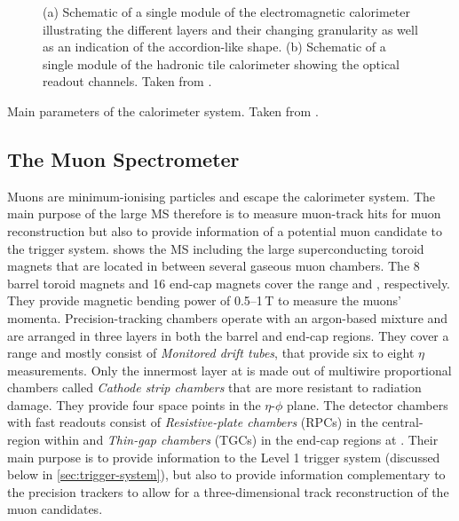\begin{figure}
    \caption{(a) Schematic of a single module of the electromagnetic calorimeter illustrating the different layers and their changing granularity as well as an indication of the accordion-like shape. (b) Schematic of a single module of the hadronic tile calorimeter showing the optical readout channels. Taken from .}
    \label{fig:ATLASmodules}
\end{figure}

\begin{table}
    \caption{Main parameters of the calorimeter system. Taken from .}
    \label{tab:ATLAScalorimeter-parameters}
\end{table}



\subsection{The Muon Spectrometer}
Muons are minimum-ionising particles and escape the calorimeter system.
The main purpose of the large MS therefore is to measure muon-track hits for muon reconstruction but also to provide information of a potential muon candidate to the trigger system.
 shows the MS including the large superconducting toroid magnets that are located in between several gaseous muon chambers.
The 8 barrel toroid magnets and 16 end-cap magnets cover the range  and , respectively. They provide magnetic bending power of \numrange{0.5}{1}\,T to measure the muons' momenta. Precision-tracking chambers operate with an argon-based mixture and are arranged in three layers in both the barrel and end-cap regions. They cover a range  and mostly consist of \emph{Monitored drift tubes}, that provide six to eight $\eta$ measurements. Only the innermost layer at  is made out of multiwire proportional chambers called \emph{Cathode strip chambers} that are more resistant to radiation damage. They provide four space points in the $\eta$-$\phi$ plane. The detector chambers with fast readouts consist of \emph{Resistive-plate chambers} (RPCs) in the central-region within  and \emph{Thin-gap chambers} (TGCs) in the end-cap regions at .
Their main purpose is to provide information to the Level 1 trigger system (discussed below in \cref{sec:trigger-system}), but also to provide information complementary to the precision trackers to allow for a three-dimensional track reconstruction of the muon candidates.

